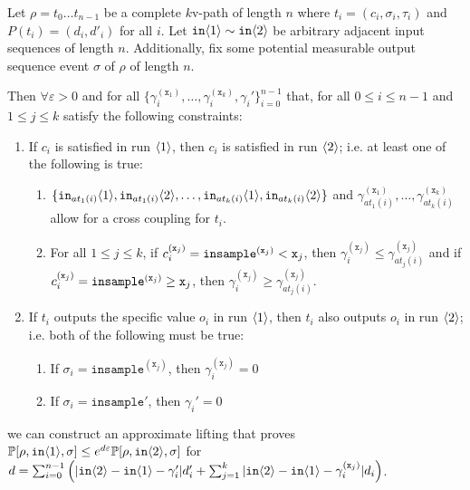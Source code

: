 \begin{lemma}\label{mvPathCouplingLemma}
    Let $\rho = t_0\ldots t_{n-1}$ be a complete $k$v-path of length $n$ where $t_i = (c_i, \sigma_i, \tau_i)$ and $P(t_i) = (d_i, d'_i)$ for all $i$. 
    Let $\texttt{in}\brangle{1}\sim \texttt{in}\brangle{2}$ be arbitrary adjacent input sequences of length $n$. Additionally, fix some potential measurable output sequence event $\sigma$ of $\rho$ of length $n$.

    Then $\forall \varepsilon>0$ and for all $\{\gamma_i^{(\texttt{x}_1)},\ldots, \gamma_i^{(\texttt{x}_k)}, \gamma_i'\}_{i=0}^{n-1}$ that, for all $0\leq i\leq n-1$ and $1\leq j\leq k$ satisfy the following constraints:\begin{enumerate}
        \item If $c_i$ is satisfied in run $\brangle{1}$, then $c_i$ is satisfied in run $\brangle{2}$; i.e. at least one of the following is true:\begin{enumerate}
            \item $\{\texttt{in}_{at_1(i)}\brangle{1}, \texttt{in}_{at_1(i)}\brangle{2}, \ldots, \texttt{in}_{at_k(i)}\brangle{1}, \texttt{in}_{at_k(i)}\brangle{2}\}$ and $\gamma_{at_1(i)}^{(\texttt{x}_1)}, \ldots, \gamma_{at_k(i)}^{(\texttt{x}_k)}$ allow for a cross coupling for $t_i$.
            \item For all $1\leq j \leq k$, if $c_i^{(\texttt{x}_j)} = \mvlguard[\texttt{x}_j]$, then $\gamma_i^{(\texttt{x}_j)}\leq \gamma^{(\texttt{x}_j)}_{at_j(i)}$ and if $c_i^{(\texttt{x}_j)} = \mvgguard[\texttt{x}_j]$, then $\gamma_i^{(\texttt{x}_j)}\geq \gamma^{(\texttt{x}_j)}_{at_j(i)}$.
        \end{enumerate}
        \item If $t_i$ outputs the specific value $o_i$ in run $\brangle{1}$, then $t_i$ also outputs $o_i$ in run $\brangle{2}$; i.e. both of the following must be true: \begin{enumerate}
            \item If $\sigma_i = \texttt{insample}^{(\texttt{x}_j)}$, then $\gamma_i^{(\texttt{x}_j)}=0$
            \item If $\sigma_i = \texttt{insample}'$, then $\gamma_i'=0$
        \end{enumerate}
    \end{enumerate}
     we can construct an approximate lifting that proves $\PP[\rho, \texttt{in}\brangle{1}, \sigma]\leq e^{d\varepsilon}\PP[\rho, \texttt{in}\brangle{2}, \sigma]$ for $d = \sum_{i=0}^{n-1}\left(|\texttt{in}\brangle{2}-\texttt{in}\brangle{1}-\gamma_i'|d_i'+\sum_{j=1}^k|\texttt{in}\brangle{2}-\texttt{in}\brangle{1}-\gamma_i^{(\texttt{x}_j)}|d_i\right)$.
\end{lemma}

